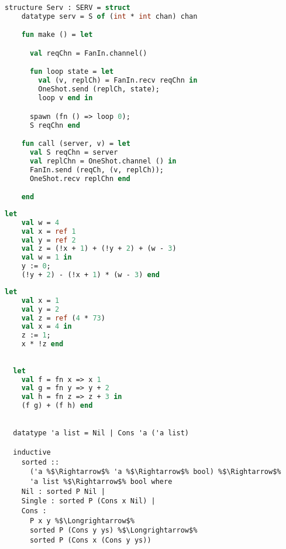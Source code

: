 \documentclass{article}
\begin{document}
\begin{lstlisting}[language=ML, style=codestyle1]
  structure Serv : SERV = struct 
    datatype serv = S of (int * int chan) chan 

    fun make () = let 

      val reqChn = FanIn.channel()

      fun loop state = let
        val (v, replCh) = FanIn.recv reqChn in 
        OneShot.send (replCh, state);
        loop v end in

      spawn (fn () => loop 0);
      S reqChn end 

    fun call (server, v) = let 
      val S reqChn = server
      val replChn = OneShot.channel () in 
      FanIn.send (reqCh, (v, replCh));
      OneShot.recv replChn end

    end
  \end{lstlisting}

\begin{lstlisting}[language=ML, style=codestyle1]
  let
    val w = 4
    val x = ref 1
    val y = ref 2
    val z = (!x + 1) + (!y + 2) + (w - 3)
    val w = 1 in
    y := 0;
    (!y + 2) - (!x + 1) * (w - 3) end
  \end{lstlisting}

\begin{lstlisting}[language=ML, style=codestyle1]
  let 
    val x = 1  
    val y = 2
    val z = ref (4 * 73)
    val x = 4 in 
    z := 1; 
    x * !z end
  \end{lstlisting}

\begin{lstlisting}[language=ML, style=codestyle1]

  let 
    val f = fn x => x 1
    val g = fn y => y + 2
    val h = fn z => z + 3 in 
    (f g) + (f h) end

\end{lstlisting}


\begin{lstlisting}[style=codestyle1, escapechar=\%]

  datatype 'a list = Nil | Cons 'a ('a list)

  inductive
    sorted ::
      ('a %$\Rightarrow$% 'a %$\Rightarrow$% bool) %$\Rightarrow$%
      'a list %$\Rightarrow$% bool where
    Nil : sorted P Nil |
    Single : sorted P (Cons x Nil) |
    Cons :
      P x y %$\Longrightarrow$%
      sorted P (Cons y ys) %$\Longrightarrow$%
      sorted P (Cons x (Cons y ys))
  \end{lstlisting}
\end{document}
